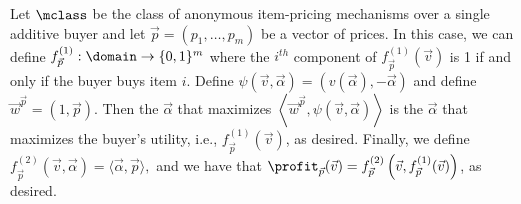 \begin{example}\label{ex:2PT2}
Let $\mclass$ be the class of anonymous item-pricing mechanisms over a single additive buyer and let $\vec{p} = (p_1,\dots, p_m)$ be a vector of prices. In this case, we can define $f_{\vec{p}}^{(1)}: \domain \to \{0,1\}^m$ where the $i^{th}$ component of $f_{\vec{p}}^{(1)}(\vec{v})$ is 1 if and only if the buyer buys item $i$. Define $\psi(\vec{v}, \vec{\alpha}) = (v(\vec{\alpha}), -\vec{\alpha})$ and define $\vec{w}^{\vec{p}} = (1, \vec{p})$. Then the $\vec{\alpha}$ that maximizes $ \left\langle\vec{w}^{\vec{p}}, \psi(\vec{v}, \vec{\alpha})\right\rangle$ is the $\vec{\alpha}$ that maximizes the buyer's utility, i.e., $f^{(1)}_{\vec{p}}(\vec{v})$, as desired.
Finally, we define $f_{\vec{p}}^{(2)}(\vec{v}, \vec{\alpha}) =\langle \vec{\alpha}, \vec{p}\rangle,$  and we have that $\profit_{\vec{p}}(\vec{v}) = f_{\vec{p}}^{(2)}\left(\vec{v}, f_{\vec{p}}^{(1)}(\vec{v})\right)$, as desired.
\end{example}

\separable*

